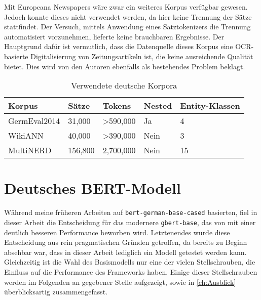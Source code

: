 Mit Europeana Newspapers \parencite{europeana} wäre zwar ein weiteres Korpus verfügbar gewesen. Jedoch konnte dieses nicht verwendet werden, da hier keine Trennung der Sätze stattfindet. Der Versuch, mittels Anwendung eines Satztokenizers die Trennung automatisiert vorzunehmen, lieferte keine brauchbaren Ergebnisse. Der Hauptgrund dafür ist vermutlich, dass die Datenquelle dieses Korpus eine OCR-basierte Digitalisierung von Zeitungsartikeln ist, die keine ausreichende Qualität bietet. Dies wird von den Autoren ebenfalls als bestehendes Problem beklagt.

\begin{table}[!htbp]
	\centering
	\caption{Verwendete deutsche Korpora}
	\label{tab:korpora}
	\begin{tabular}{@{}lllll@{}}
		\toprule
		\textbf{Korpus}   & \textbf{Sätze} & \textbf{Tokens}       & \textbf{Nested} & \textbf{Entity-Klassen} \\ \midrule
		GermEval2014    & 31,000         & \textgreater{}590,000 & Ja              & 4                       \\
		WikiANN         & 40,000         & \textgreater{}390,000 & Nein            & 3                       \\
		MultiNERD\footnotemark       & 156,800        & 2,700,000             & Nein            & 15                      \\ \bottomrule
		\end{tabular}
\end{table}

\section{Deutsches BERT-Modell}
\label{ch:MRC:sec:DeutschBERT}

Während meine früheren Arbeiten auf \verb|bert-german-base-cased| \parencite{bert-base-german-cased} basierten, fiel in dieser Arbeit die Entscheidung für das modernere \verb|gbert-base|, das von \cite{gbert} mit einer deutlich besseren Performance beworben wird. Letztenendes wurde diese Entscheidung aus rein pragmatischen Gründen getroffen, da bereits zu Beginn absehbar war, dass in dieser Arbeit lediglich ein Modell getestet werden kann. Gleichzeitig ist die Wahl des Basismodells nur eine der vielen Stellschrauben, die Einfluss auf die Performance des Frameworks haben. Einige dieser Stellschrauben werden im Folgenden an gegebener Stelle aufgezeigt, sowie in \autoref{ch:Ausblick} überblicksartig zusammengefasst.


